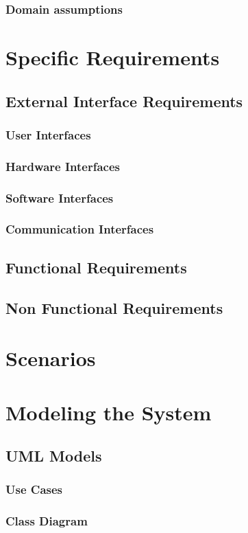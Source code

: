 \documentclass[11pt,a4paper]{report}
\begin{document}
\subsection{Domain assumptions}
\chapter{Specific Requirements}
\section{External Interface Requirements}
\subsection{User Interfaces}
\subsection{Hardware Interfaces}
\subsection{Software Interfaces}
\subsection{Communication Interfaces}
\section{Functional Requirements}
\section{Non Functional Requirements}
\chapter{Scenarios}
\chapter{Modeling the System}
\section{UML Models}
\subsection{Use Cases}
\subsection{Class Diagram}
\end{document}
